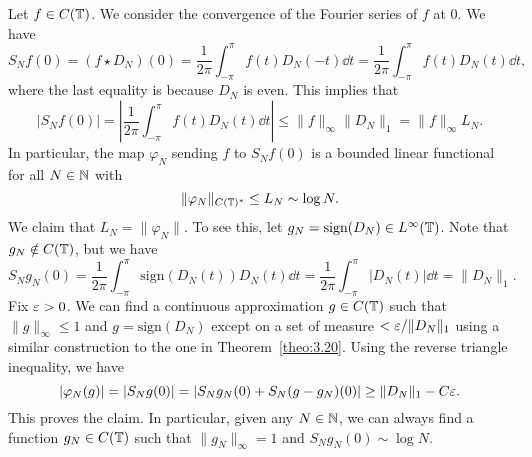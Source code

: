 Let $f \in C(\mathbb{T})$. We consider the convergence of the Fourier series of $f$ at $0$. 
We have 
\[ S_N f(0) = (f \star D_N)(0) = \frac{1}{2\pi} \int_{-\pi}^\pi f(t) D_N(-t)\dd t 
= \frac{1}{2\pi} \int_{-\pi}^\pi f(t) D_N(t)\dd t, \] 
where the last equality is because $D_N$ is even. This implies that 
\[ |S_N f(0)| = \left| \frac{1}{2\pi} \int_{-\pi}^\pi f(t) D_N(t)\dd t \right| 
\leq \|f\|_\infty \|D_N\|_1 = \|f\|_\infty L_N. \] 
In particular, the map $\varphi_N$ sending $f$ to $S_N f(0)$ is a bounded 
linear functional for all $N \in \mathbb{N}$ with 
\[ \|\varphi_N\|_{C(\mathbb{T})^*} \leq L_N \sim \log N. \] 
We claim that $L_N = \|\varphi_N\|$. To see this, let $g_N = \text{sign}(D_N) \in L^\infty(\mathbb{T})$. 
Note that $g_N \notin C(\mathbb{T})$, but we have 
\[ S_N g_N(0) = \frac{1}{2\pi} \int_{-\pi}^\pi \text{sign}(D_N(t))D_N(t) \dd t
= \frac{1}{2\pi} \int_{-\pi}^\pi |D_N(t)|\dd t = \|D_N\|_1. \] 
Fix $\varepsilon > 0$. We can find a continuous approximation $g \in C(\mathbb{T})$ such that 
$\|g\|_\infty \leq 1$ and $g = \text{sign}(D_N)$ except on a set of measure 
$< \varepsilon/\|D_N\|_1$ using a similar construction to the one in Theorem~\ref{theo:3.20}.
Using the reverse triangle inequality, we have 
\[ |\varphi_N(g)| = |S_N g(0)| = |S_N g_N(0) + S_N (g - g_N)(0)| 
\geq \|D_N\|_1 - C\varepsilon. \] 
This proves the claim. In particular, given any $N \in \mathbb{N}$, we can always find a 
function $g_N \in C(\mathbb{T})$ such that $\|g_N\|_\infty = 1$ and $S_N g_N(0) \sim \log N$.
